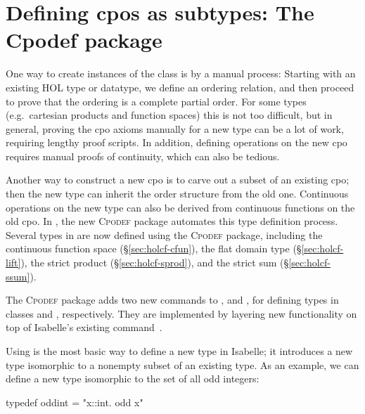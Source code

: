 
\section{Defining cpos as subtypes: The Cpodef package}
\label{sec:holcf-cpodef}

One way to create instances of the  class is by a manual process: Starting with an existing HOL type or datatype, we define an ordering relation, and then proceed to prove that the ordering is a complete partial order. For some types (e.g.\ cartesian products and function spaces) this is not too difficult, but in general, proving the cpo axioms manually for a new type can be a lot of work, requiring lengthy proof scripts. In addition, defining operations on the new cpo requires manual proofs of continuity, which can also be tedious.

Another way to construct a new cpo is to carve out a subset of an existing cpo; then the new type can inherit the order structure from the old one. Continuous operations on the new type can also be derived from continuous functions on the old cpo. In , the new \textsc{Cpodef} package automates this type definition process. Several types in  are now defined using the \textsc{Cpodef} package, including the continuous function space (\S\ref{sec:holcf-cfun}), the flat domain type  (\S\ref{sec:holcf-lift}), the strict product (\S\ref{sec:holcf-sprod}), and the strict sum (\S\ref{sec:holcf-ssum}).

The \textsc{Cpodef} package adds two new commands to ,  and , for defining types in classes  and , respectively. They are implemented by layering new functionality on top of Isabelle's existing  command~\cite[\S8.5]{isabelle-tutorial}.

Using  is the most basic way to define a new type in Isabelle; it introduces a new type isomorphic to a nonempty subset of an existing type. As an example, we can define a new type isomorphic to the set of all odd integers:

\begin{isacode}
typedef oddint = "{x::int. odd x}"
\end{isacode}

